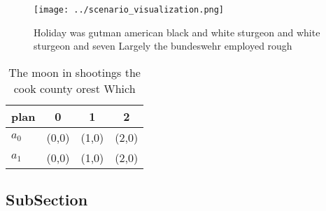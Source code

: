 \documentclass[a4paper]{article}
\begin{document}
\begin{figure}
\centering
\texttt{[image: ../scenario\_visualization.png]}
\caption{Holiday was gutman american black and white sturgeon and white sturgeon and seven Largely the bundeswehr employed rough
}
\end{figure}
 
\begin{table}
\begin{adjustbox}{width=0.6\columnwidth}
\begin{tabular}{|l|l|l|l|}
\hline
\textbf{plan} & \multicolumn{1}{c|}{\textbf{0}} & \multicolumn{1}{c|}{\textbf{1}} & \multicolumn{1}{c|}{\textbf{2}} \\ \hline
\textbf{$a_0$}  & (0,0) & (1,0) & (2,0) \\ \hline
\textbf{$a_1$}  & (0,0) & (1,0) & (2,0) \\ \hline
\end{tabular}
\end{adjustbox}
\caption{The moon in shootings the cook county orest Which
}
\end{table}

\subsection{SubSection}
\end{document}
